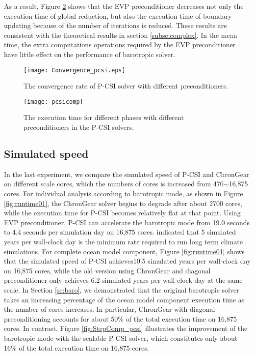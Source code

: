 As a result, Figure \ref{fig:component2} shows that the EVP preconditioner decreases not only  the execution time of global reduction, but also the execution time of boundary updating because of the number of iterations is reduced.
These results are consistent with the theoretical results in section \ref{subse:complex}.
In the mean time, the extra computations operations required by the EVP preconditioner have little effect on the performance of barotropic solver.

\begin {figure}[!t]
\texttt{[image: Convergence\_pcsi.eps]}
\caption[] {The convergence rate of P-CSI solver with different preconditioners. \label{fig:convergence_pcsi}}
\end{figure}

\begin {figure}[t!]
\texttt{[image: pcsicomp]}
\caption[] {The execution time for different phases with different preconditioners in the P-CSI solvers. \label{fig:component2}}
\end {figure}


\subsection{Simulated speed}
In the last experiment, we compare the simulated speed of P-CSI and ChronGear on different scale cores, which the numbers of cores is increased from 470$\sim$16,875 cores.
For individual analysis according to barotropic mode, as shown in Figure \ref{fig:runtime01}, the ChronGear solver begins to degrade after about 2700 cores, while the execution time for P-CSI becomes relatively flat at that point.  Using EVP preconditioner, P-CSI can accelerate the barotropic mode from 19.0 seconds to 4.4 seconds per simulation day on 16,875 cores. \cite{dennis2012computational} indicated that 5 simulated years per wall-clock day is the minimum rate required to run long term climate simulations. For complete ocean model component, Figure \ref{fig:runtime01} shows that the simulated speed of P-CSI achieves10.5 simulated years per wall-clock day on 16,875 cores,  while the old version using ChronGear and diagonal preconditioner only achieves 6.2 simulated years per wall-clock day at the same scale. In Section \ref{se:baro}, we demonstrated that the original barotropic solver takes an increasing percentage of the ocean model component execution time as the number of cores increases. In particular, ChronGear with diagonal preconditioning accounts for about 50\% of the total execution time on 16,875 cores. In contrast, Figure \ref{fig:StepComp_pcsi} illustrates the improvement of the barotropic mode with the scalable P-CSI solver, which constitutes only about 16\% of the total execution time on 16,875 cores.

